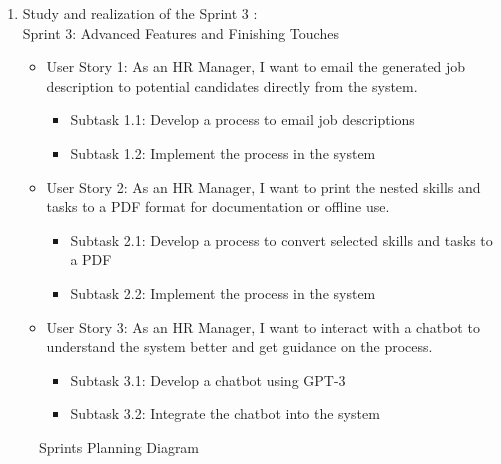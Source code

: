 \begin{enumerate}
    \item Study and realization of the Sprint 3 : \\
          Sprint 3: Advanced Features and Finishing Touches
          \begin{itemize}
              \renewcommand\labelitemi{-}
              \item User Story 1: As an HR Manager, I want to email the generated job description to potential candidates directly from the system.\\
                    \begin{itemize}
                        \item Subtask 1.1: Develop a process to email job descriptions
                        \item Subtask 1.2: Implement the process in the system
                    \end{itemize}
              \item User Story 2: As an HR Manager, I want to print the nested skills and tasks to a PDF format for documentation or offline use. \\
                    \begin{itemize}
                        \item Subtask 2.1: Develop a process to convert selected skills and tasks to a PDF
                        \item Subtask 2.2: Implement the process in the system
                    \end{itemize}
              \item User Story 3: As an HR Manager, I want to interact with a chatbot to understand the system better and get guidance on the process. \\
                    \begin{itemize}
                        \item Subtask 3.1: Develop a chatbot using GPT-3
                        \item Subtask 3.2: Integrate the chatbot into the system 
                    \end{itemize}
          \end{itemize}
\end{enumerate} 

\vspace{2cm}

\begin{figure}[H]
    \centering
    \caption{ Sprints Planning Diagram }
    \label{fig:Sprints_Graph}
\end{figure}

